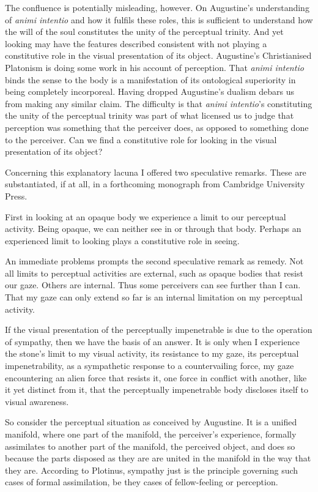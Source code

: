\documentclass[12pt]{article}
\begin{document}
The confluence is potentially misleading, however. On Augustine’s understanding of \emph{animi intentio} and how it fulfils these roles, this is sufficient to understand how the will of the soul constitutes the unity of the perceptual trinity. And yet looking may have the features described consistent with not playing a constitutive role in the visual presentation of its object. Augustine’s Christianised Platonism is doing some work in his account of perception. That \emph{animi intentio} binds the sense to the body is a manifestation of its ontological superiority in being completely incorporeal. Having dropped Augustine’s dualism debars us from making any similar claim. The difficulty is that \emph{animi intentio}’s constituting the unity of the perceptual trinity was part of what licensed us to judge that perception was something that the perceiver does, as opposed to something done to the perceiver. Can we find a constitutive role for looking in the visual presentation of its object?

Concerning this explanatory lacuna I offered two speculative remarks. These are substantiated, if at all, in a forthcoming monograph from Cambridge University Press.

First in looking at an opaque body we experience a limit to our perceptual activity. Being opaque, we can neither see in or through that body. Perhaps an experienced limit to looking plays a constitutive role in seeing. 

An immediate problems prompts the second speculative remark as remedy. Not all limits to perceptual activities are external, such as opaque bodies that resist our gaze. Others are internal. Thus some perceivers can see further than I can. That my gaze can only extend so far is an internal limitation on my perceptual activity. 

If the visual presentation of the perceptually impenetrable is due to the operation of sympathy, then we have the basis of an answer. It is only when I experience the stone’s limit to my visual activity, its resistance to my gaze, its perceptual impenetrability, as a sympathetic response to a countervailing force, my gaze encountering an alien force that resists it, one force in conflict with another, like it yet distinct from it, that the perceptually impenetrable body discloses itself to visual awareness.

So consider the perceptual situation as conceived by Augustine. It is a unified manifold, where one part of the manifold, the perceiver's experience, formally assimilates to another part of the manifold, the perceived object, and does so because the parts disposed as they are are united in the manifold in the way that they are. According to Plotinus, sympathy just is the principle governing such cases of formal assimilation, be they cases of fellow-feeling or perception. 
\end{document}
